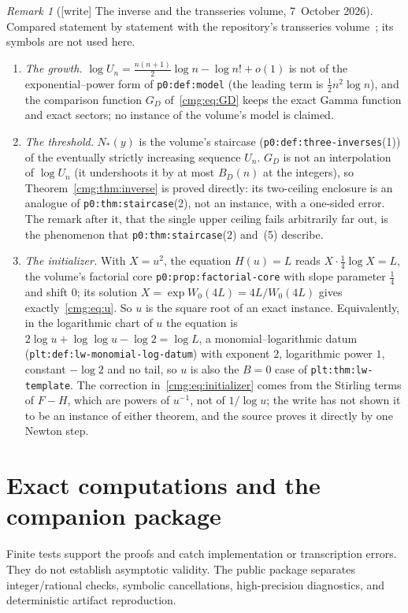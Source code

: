 \documentclass[11pt,letterpaper]{article}
\numberwithin{equation}{section}
\theoremstyle{definition}\newtheorem{definition}[theorem]{Definition}
\theoremstyle{remark}\newtheorem{remark}[theorem]{Remark}
\newcommand{\file}[1]{\nolinkurl{#1}}
\begin{document}
\begin{remark}[{[write]} The inverse and the transseries volume, 7~October 2026]\label{cmg:rem:transseries}
Compared statement by statement with the repository's transseries
volume~\cite{TSvol}; its symbols are not used here.
\begin{enumerate}\raggedright
\item \emph{The growth.} $\log U_n=\frac{n(n+1)}2\log n-\log n!+o(1)$ is not of the exponential--power form of \file{p0:def:model} (the leading term is $\frac12n^2\log n$), and the comparison function $G_D$ of~\eqref{cmg:eq:GD} keeps the exact Gamma function and exact sectors; no instance of the volume's model is claimed.
\item \emph{The threshold.} $N_*(y)$ is the volume's staircase (\file{p0:def:three-inverses}(1)) of the eventually strictly increasing sequence $U_n$. $G_D$ is not an interpolation of $\log U_n$ (it undershoots it by at most $B_D(n)$ at the integers), so Theorem~\ref{cmg:thm:inverse} is proved directly: its two-ceiling enclosure is an analogue of \file{p0:thm:staircase}(2), not an instance, with a one-sided error. The remark after it, that the single upper ceiling fails arbitrarily far out, is the phenomenon that \file{p0:thm:staircase}(2) and~(5) describe.
\item \emph{The initializer.} With $X=u^2$, the equation $H(u)=L$ reads $X\cdot\frac14\log X=L$, the volume's factorial core \file{p0:prop:factorial-core} with slope parameter $\frac14$ and shift $0$; its solution $X=\exp W_0(4L)=4L/W_0(4L)$ gives exactly~\eqref{cmg:eq:u}. So $u$ is the square root of an exact instance. Equivalently, in the logarithmic chart of $u$ the equation is $2\log u+\log\log u-\log2=\log L$, a monomial--logarithmic datum (\file{plt:def:lw-monomial-log-datum}) with exponent $2$, logarithmic power $1$, constant $-\log 2$ and no tail, so $u$ is also the $B=0$ case of \file{plt:thm:lw-template}. The correction in~\eqref{cmg:eq:initializer} comes from the Stirling terms of $F-H$, which are powers of $u^{-1}$, not of $1/\log u$; the write has not shown it to be an instance of either theorem, and the source proves it directly by one Newton step.
\end{enumerate}
\end{remark}

\section{Exact computations and the companion package}\label{cmg:sec:computations}
Finite tests support the proofs and catch implementation or transcription errors. They do not establish asymptotic validity. The public package separates integer/rational checks, symbolic cancellations, high-precision diagnostics, and deterministic artifact reproduction.
\end{document}
